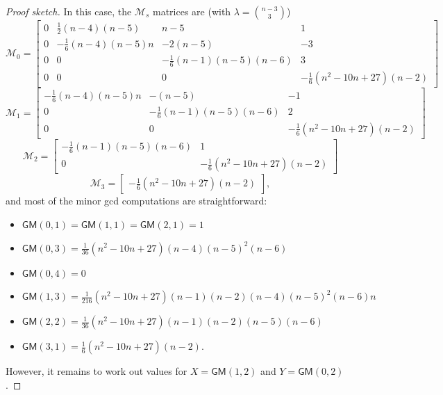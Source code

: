 \documentclass[11pt]{article}
\theoremstyle{definition}
\numberwithin{equation}{section}
\numberwithin{equation}{section}
\newcommand{\M}{\mathcal{M}}
\newcommand{\GM}{\mathsf{GM}}
\begin{document}
\begin{proof}[{\it Proof sketch}]
In this case, the $\M_s$ matrices are (with $\lambda = \binom{n-3}{3}$)
\[ \M_0 = \begin{bmatrix} 0 & \frac{1}{2}(n-4)(n-5) & n-5 & 1 \\ 0 & -\frac{1}{6}(n-4)(n-5)n & -2(n-5) & -3 \\ 0 & 0 & -\frac{1}{6}(n-1)(n-5)(n-6) & 3 \\ 0 & 0 & 0 & -\frac{1}{6}(n^2 - 10n + 27)(n-2) \end{bmatrix}  \]
\[ \M_1 = \begin{bmatrix} -\frac{1}{6}(n-4)(n-5)n & -(n-5) & -1 \\ 0 & -\frac{1}{6}(n-1)(n-5)(n-6) & 2 \\ 0 & 0 & -\frac{1}{6}(n^2 - 10n + 27)(n-2) \end{bmatrix}  \]
\[ \M_2 = \begin{bmatrix} -\frac{1}{6}(n-1)(n-5)(n-6) & 1 \\ 0 & -\frac{1}{6}(n^2 - 10n + 27)(n-2) \end{bmatrix}  \]
\[ \M_3 = \begin{bmatrix} -\frac{1}{6}(n^2 - 10n + 27)(n-2) \end{bmatrix}, \]
and most of the minor gcd computations are straightforward:
\begin{itemize} 
    \item $\GM(0,1) = \GM(1,1) = \GM(2,1) = 1$
    \item $\GM(0,3) = \frac{1}{36}(n^2 - 10n + 27)(n - 4)(n - 5)^2(n - 6)$
    \item $\GM(0,4) = 0$
    \item $\GM(1,3) = \frac{1}{216}(n^2 - 10n + 27)(n - 1)(n - 2)(n - 4)(n - 5)^2 (n - 6)n$
    \item $\GM(2,2) = \frac{1}{36}(n^2 - 10n + 27)(n - 1)(n - 2)(n - 5)(n - 6)$
    \item $\GM(3,1) = \frac{1}{6}(n^2 - 10n + 27)(n-2)$.
\end{itemize}
However, it remains to work out values for $X = \GM(1,2)$ and $Y = \GM(0,2)$.


\end{proof}
\end{document}
